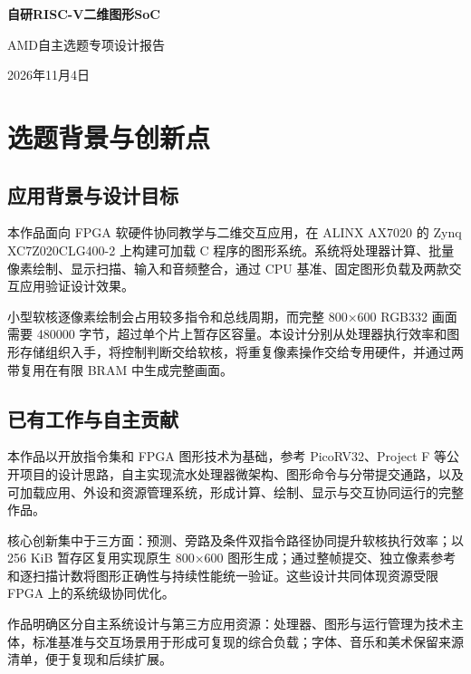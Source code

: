 \documentclass[UTF8,a4paper,12pt]{ctexart}
\begin{document}
\begin{center}
{\fontsize{18}{27}\selectfont\heiti\bfseries 自研RISC-V二维图形SoC}\par
\vspace{0.7em}
{\fontsize{12}{18}\selectfont AMD自主选题专项设计报告}\par
2026年11月4日
\end{center}


\section{选题背景与创新点}

\subsection{应用背景与设计目标}

本作品面向 FPGA 软硬件协同教学与二维交互应用，在 ALINX AX7020 的 Zynq XC7Z020CLG400-2 上构建可加载 C 程序的图形系统。系统将处理器计算、批量像素绘制、显示扫描、输入和音频整合，通过 CPU 基准、固定图形负载及两款交互应用验证设计效果。\par

小型软核逐像素绘制会占用较多指令和总线周期，而完整 800×600 RGB332 画面需要 480000 字节，超过单个片上暂存区容量。本设计分别从处理器执行效率和图形存储组织入手，将控制判断交给软核，将重复像素操作交给专用硬件，并通过两带复用在有限 BRAM 中生成完整画面。\par

\subsection{已有工作与自主贡献}

本作品以开放指令集和 FPGA 图形技术为基础，参考 PicoRV32、Project F 等公开项目的设计思路，自主实现流水处理器微架构、图形命令与分带提交通路，以及可加载应用、外设和资源管理系统，形成计算、绘制、显示与交互协同运行的完整作品。\par

核心创新集中于三方面：预测、旁路及条件双指令路径协同提升软核执行效率；以 256 KiB 暂存区复用实现原生 800×600 图形生成；通过整帧提交、独立像素参考和逐扫描计数将图形正确性与持续性能统一验证。这些设计共同体现资源受限 FPGA 上的系统级协同优化。\par

作品明确区分自主系统设计与第三方应用资源：处理器、图形与运行管理为技术主体，标准基准与交互场景用于形成可复现的综合负载；字体、音乐和美术保留来源清单，便于复现和后续扩展。\par
\end{document}
